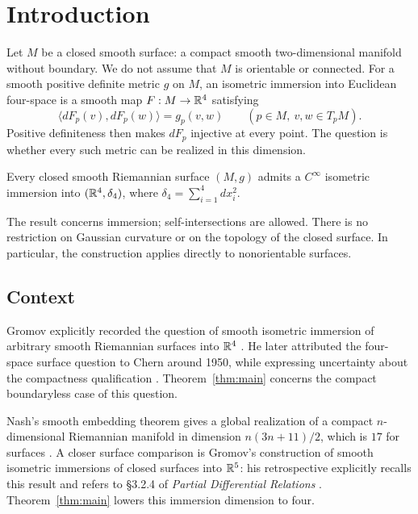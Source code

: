 \section{Introduction}\label{sec:introduction}

Let $M$ be a closed smooth surface: a compact smooth two-dimensional manifold
without boundary. We do not assume that $M$ is orientable or connected.
For a smooth positive definite metric $g$ on $M$, an isometric immersion into
Euclidean four-space is a smooth map $F:M\to\mathbb{R}^4$ satisfying
\[
 \langle dF_p(v),dF_p(w)\rangle=g_p(v,w)
 \qquad(p\in M,\ v,w\in T_pM).
\]
Positive definiteness then makes $dF_p$ injective at every point.
The question is whether every such metric can be realized in this dimension.

\begin{theorem}\label{thm:main}
Every closed smooth Riemannian surface $(M,g)$ admits a $C^\infty$ isometric
immersion into $(\mathbb{R}^4,\delta_4)$, where $\delta_4=\sum_{i=1}^4 dx_i^2$.
\end{theorem}

The result concerns immersion; self-intersections are allowed. There is no
restriction on Gaussian curvature or on the topology of the closed surface.
In particular, the construction applies directly to nonorientable surfaces.

\subsection{Context}
Gromov explicitly recorded the question of smooth isometric immersion of
arbitrary smooth Riemannian surfaces into $\mathbb{R}^4$
\cite[\S I, Remark~(d), p.~3 of the author version]{Gromov2000}.
He later attributed the four-space surface question to Chern around 1950,
while expressing uncertainty about the compactness qualification
\cite[p.~4, footnote~6]{Gromov2015}.
Theorem~\ref{thm:main} concerns the compact boundaryless case of this question.

Nash's smooth embedding theorem gives a global realization of a compact
$n$-dimensional Riemannian manifold in dimension $n(3n+11)/2$, which is $17$
for surfaces \cite[Theorem~2, p.~59]{Nash1956}.
A closer surface comparison is Gromov's construction of smooth
isometric immersions of closed surfaces into $\mathbb{R}^5$: his retrospective
explicitly recalls this result and refers to \S3.2.4 of
\emph{Partial Differential Relations}
\cite[p.~59]{Gromov2015}\cite{GromovPDR1986}.
Theorem~\ref{thm:main} lowers this immersion dimension to four.

